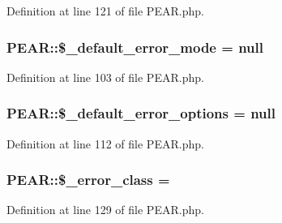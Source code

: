 Definition at line 121 of file P\+E\+A\+R.\+php.

\subsubsection[{\texorpdfstring{\$\+\_\+default\+\_\+error\+\_\+mode}{$_default_error_mode}}]{\setlength{\rightskip}{0pt plus 5cm}P\+E\+A\+R\+::\$\+\_\+default\+\_\+error\+\_\+mode = {\bf null}}\hypertarget{classPEAR_a6b3ff3d78a7b1d62c0de6b1190046a89}{}\label{classPEAR_a6b3ff3d78a7b1d62c0de6b1190046a89}


Definition at line 103 of file P\+E\+A\+R.\+php.

\subsubsection[{\texorpdfstring{\$\+\_\+default\+\_\+error\+\_\+options}{$_default_error_options}}]{\setlength{\rightskip}{0pt plus 5cm}P\+E\+A\+R\+::\$\+\_\+default\+\_\+error\+\_\+options = {\bf null}}\hypertarget{classPEAR_ac71147b819daa267f29980e941efa23c}{}\label{classPEAR_ac71147b819daa267f29980e941efa23c}


Definition at line 112 of file P\+E\+A\+R.\+php.

\subsubsection[{\texorpdfstring{\$\+\_\+error\+\_\+class}{$_error_class}}]{\setlength{\rightskip}{0pt plus 5cm}P\+E\+A\+R\+::\$\+\_\+error\+\_\+class = \textquotesingle{}}\hypertarget{classPEAR_a6519b9822433b9dc3db0def7508e2b61}{}\label{classPEAR_a6519b9822433b9dc3db0def7508e2b61}


Definition at line 129 of file P\+E\+A\+R.\+php.

